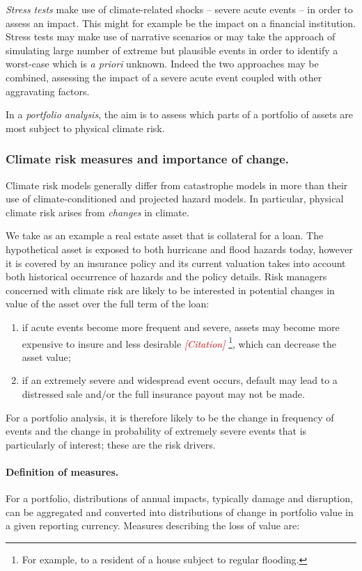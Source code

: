 \documentclass[a4paper,11pt]{extarticle} %
\theoremstyle{definition}
\begin{document}
\emph{Stress tests} make use of climate-related shocks -- severe acute events -- in order to assess an impact. This might for example be the impact on a financial institution. Stress tests may make use of narrative scenarios or may take the approach of simulating large number of extreme but plausible events in order to identify a worst-case which is \emph{a priori} unknown. Indeed the two approaches may be combined, assessing the impact of a severe acute event coupled with other aggravating factors.

In a \emph{portfolio analysis}, the aim is to assess which parts of a portfolio of assets are most subject to physical climate risk.

\subsubsection{Climate risk measures and importance of change.}
Climate risk models generally differ from catastrophe models in more than their use of climate-conditioned and projected hazard models. In particular, physical climate risk arises from \emph{changes} in climate.

We take as an example a real estate asset that is collateral for a loan. The hypothetical asset is exposed to both hurricane and flood hazards today, however it is covered by an insurance policy and its current valuation takes into account both historical occurrence of hazards and the policy details. Risk managers concerned with climate risk are likely to be interested in potential changes in value of the asset over the full term of the loan:

\begin{enumerate}
    \item if acute events become more frequent and severe, assets may become more expensive to insure and less desirable {\textcolor{red}{\emph{[Citation]}}} \footnote{For example, to a resident of a house subject to regular flooding.}, which can decrease the asset value;
    \item if an extremely severe and widespread event occurs, default may lead to a distressed sale and/or the full insurance payout may not be made.
\end{enumerate}

For a portfolio analysis, it is therefore likely to be the change in frequency of events and the change in probability of extremely severe events that is particularly of interest; these are the risk drivers.

\paragraph{Definition of measures.} For a portfolio, distributions of annual impacts, typically damage and disruption, can be aggregated and converted into distributions of change in portfolio value in a given reporting currency. Measures describing the loss of value are:
\end{document}

